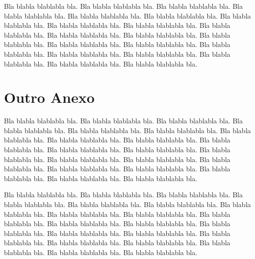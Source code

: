 \documentclass[tese,capa]{texufpel}
\begin{document}
Bla blabla blablabla bla.  Bla blabla blablabla bla.  Bla blabla
blablabla bla.  Bla blabla blablabla bla.  Bla blabla blablabla bla.
Bla blabla blablabla bla.  Bla blabla blablabla bla.  Bla blabla
blablabla bla.  Bla blabla blablabla bla.  Bla blabla blablabla bla.
Bla blabla blablabla bla.  Bla blabla blablabla bla.  Bla blabla
blablabla bla.  Bla blabla blablabla bla.  Bla blabla blablabla bla.
Bla blabla blablabla bla.  Bla blabla blablabla bla.  Bla blabla
blablabla bla.  Bla blabla blablabla bla.  Bla blabla blablabla bla.
Bla blabla blablabla bla.

\chapter{Outro Anexo}

Bla blabla blablabla bla.  Bla blabla blablabla bla.  Bla blabla
blablabla bla.  Bla blabla blablabla bla.  Bla blabla blablabla bla.
Bla blabla blablabla bla.  Bla blabla blablabla bla.  Bla blabla
blablabla bla.  Bla blabla blablabla bla.  Bla blabla blablabla bla.
Bla blabla blablabla bla.  Bla blabla blablabla bla.  Bla blabla
blablabla bla.  Bla blabla blablabla bla.  Bla blabla blablabla bla.
Bla blabla blablabla bla.  Bla blabla blablabla bla.  Bla blabla
blablabla bla.  Bla blabla blablabla bla.  Bla blabla blablabla bla.
Bla blabla blablabla bla.

Bla blabla blablabla bla.  Bla blabla blablabla bla.  Bla blabla
blablabla bla.  Bla blabla blablabla bla.  Bla blabla blablabla bla.
Bla blabla blablabla bla.  Bla blabla blablabla bla.  Bla blabla
blablabla bla.  Bla blabla blablabla bla.  Bla blabla blablabla bla.
Bla blabla blablabla bla.  Bla blabla blablabla bla.  Bla blabla
blablabla bla.  Bla blabla blablabla bla.  Bla blabla blablabla bla.
Bla blabla blablabla bla.  Bla blabla blablabla bla.  Bla blabla
blablabla bla.  Bla blabla blablabla bla.  Bla blabla blablabla bla.
Bla blabla blablabla bla.

\end{document}
